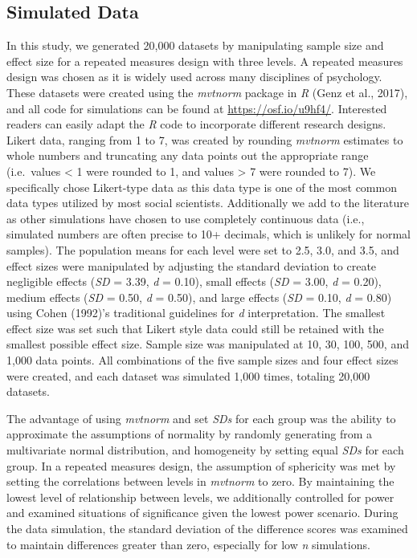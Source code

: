 \documentclass[english,man]{apa6}
\theoremstyle{definition}
\theoremstyle{definition}
\theoremstyle{definition}
\theoremstyle{remark}
\begin{document}
\subsection{Simulated Data}\label{simulated-data}

In this study, we generated 20,000 datasets by manipulating sample size
and effect size for a repeated measures design with three levels. A
repeated measures design was chosen as it is widely used across many
disciplines of psychology. These datasets were created using the
\emph{mvtnorm} package in \emph{R} (Genz et al., 2017), and all code for
simulations can be found at \url{https://osf.io/u9hf4/}. Interested
readers can easily adapt the \emph{R} code to incorporate different
research designs. Likert data, ranging from 1 to 7, was created by
rounding \emph{mvtnorm} estimates to whole numbers and truncating any
data points out the appropriate range (i.e.~values \textless{} 1 were
rounded to 1, and values \textgreater{} 7 were rounded to 7). We
specifically chose Likert-type data as this data type is one of the most
common data types utilized by most social scientists. Additionally we
add to the literature as other simulations have chosen to use completely
continuous data (i.e., simulated numbers are often precise to 10+
decimals, which is unlikely for normal samples). The population means
for each level were set to 2.5, 3.0, and 3.5, and effect sizes were
manipulated by adjusting the standard deviation to create negligible
effects (\emph{SD} = 3.39, \emph{d} = 0.10), small effects (\emph{SD} =
3.00, \emph{d} = 0.20), medium effects (\emph{SD} = 0.50, \emph{d} =
0.50), and large effects (\emph{SD} = 0.10, \emph{d} = 0.80) using Cohen
(1992)'s traditional guidelines for \emph{d} interpretation. The
smallest effect size was set such that Likert style data could still be
retained with the smallest possible effect size. Sample size was
manipulated at 10, 30, 100, 500, and 1,000 data points. All combinations
of the five sample sizes and four effect sizes were created, and each
dataset was simulated 1,000 times, totaling 20,000 datasets.

The advantage of using \emph{mvtnorm} and set \emph{SDs} for each group
was the ability to approximate the assumptions of normality by randomly
generating from a multivariate normal distribution, and homogeneity by
setting equal \emph{SDs} for each group. In a repeated measures design,
the assumption of sphericity was met by setting the correlations between
levels in \emph{mvtnorm} to zero. By maintaining the lowest level of
relationship between levels, we additionally controlled for power and
examined situations of significance given the lowest power scenario.
During the data simulation, the standard deviation of the difference
scores was examined to maintain differences greater than zero,
especially for low \emph{n} simulations.
\end{document}
